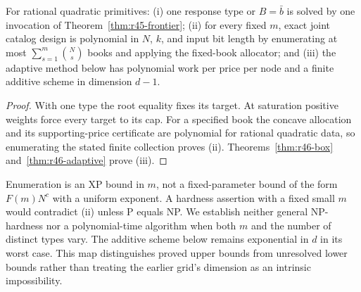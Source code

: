 \begin{proposition}\label{prop:r46-complexity}
For rational quadratic primitives: (i) one response type or $B=\bar b$ is solved by one invocation of Theorem~\ref{thm:r45-frontier}; (ii) for every fixed $m$, exact joint catalog design is polynomial in $N$, $k$, and input bit length by enumerating at most $\sum_{s=1}^{m}\binom Ns$ books and applying the fixed-book allocator; and (iii) the adaptive method below has polynomial work per price per node and a finite additive scheme in dimension $d-1$.
\end{proposition}
\begin{proof}
With one type the root equality fixes its target. At saturation positive weights force every target to its cap. For a specified book the concave allocation and its supporting-price certificate are polynomial for rational quadratic data, so enumerating the stated finite collection proves (ii). Theorems~\ref{thm:r46-box} and~\ref{thm:r46-adaptive} prove (iii).
\end{proof}
Enumeration is an XP bound in $m$, not a fixed-parameter bound of the form $F(m)N^c$ with a uniform exponent. A hardness assertion with a fixed small $m$ would contradict (ii) unless P equals NP. We establish neither general NP-hardness nor a polynomial-time algorithm when both $m$ and the number of distinct types vary. The additive scheme below remains exponential in $d$ in its worst case. This map distinguishes proved upper bounds from unresolved lower bounds rather than treating the earlier grid's dimension as an intrinsic impossibility.
